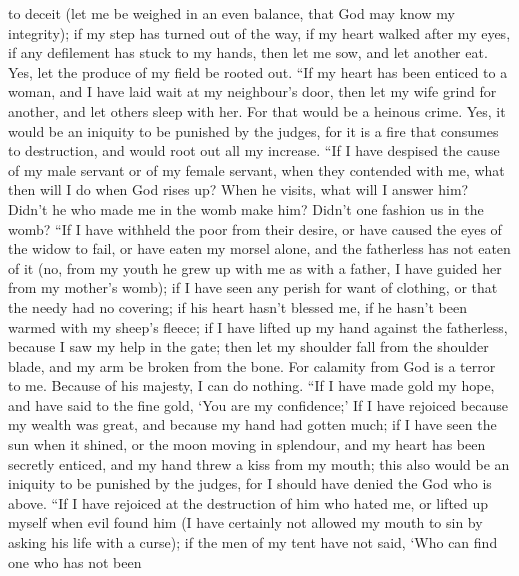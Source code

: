 to deceit  (let me be weighed in an even balance, that God
may know my integrity);  if my step has turned out of the
way, if my heart walked after my eyes, if any defilement has stuck to my
hands,  then let me sow, and let another eat. Yes, let the
produce of my field be rooted out.  ``If my heart has been
enticed to a woman, and I have laid wait at my neighbour's door,
 then let my wife grind for another, and let others sleep
with her.  For that would be a heinous crime. Yes, it would
be an iniquity to be punished by the judges,  for it is a
fire that consumes to destruction, and would root out all my increase.
 ``If I have despised the cause of my male servant or of my
female servant, when they contended with me,  what then
will I do when God rises up? When he visits, what will I answer him?
 Didn't he who made me in the womb make him? Didn't one
fashion us in the womb?  ``If I have withheld the poor from
their desire, or have caused the eyes of the widow to fail,
 or have eaten my morsel alone, and the fatherless has not
eaten of it  (no, from my youth he grew up with me as with
a father, I have guided her from my mother's womb);  if I
have seen any perish for want of clothing, or that the needy had no
covering;  if his heart hasn't blessed me, if he hasn't
been warmed with my sheep's fleece;  if I have lifted up my
hand against the fatherless, because I saw my help in the gate;
 then let my shoulder fall from the shoulder blade, and my
arm be broken from the bone.  For calamity from God is a
terror to me. Because of his majesty, I can do nothing. 
``If I have made gold my hope, and have said to the fine gold, `You are
my confidence;'  If I have rejoiced because my wealth was
great, and because my hand had gotten much;  if I have seen
the sun when it shined, or the moon moving in splendour, 
and my heart has been secretly enticed, and my hand threw a kiss from my
mouth;  this also would be an iniquity to be punished by
the judges, for I should have denied the God who is above. 
``If I have rejoiced at the destruction of him who hated me, or lifted
up myself when evil found him  (I have certainly not
allowed my mouth to sin by asking his life with a curse); 
if the men of my tent have not said, `Who can find one who has not been
